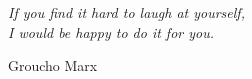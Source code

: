 \begin{dedication}

{\selectfont %
{

\big

\textit{If you find it hard to laugh at yourself,\\ 
I would be happy to do it for you.}

Groucho Marx
}
}
\end{dedication}


